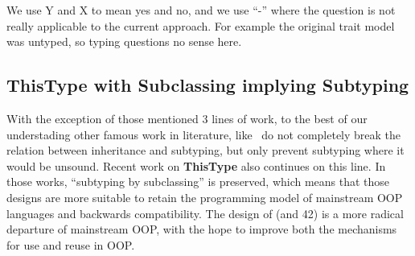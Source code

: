We use Y and X to mean yes and no, and we use ``-'' where the question is not really applicable to the current approach. For example the original trait model was untyped, so typing questions no sense here.

\subsection{ThisType with Subclassing implying Subtyping}
With the exception of those mentioned 3 lines of work, to the best of our understading
other famous work in literature, like~\cite{odersky2008programming,nystrom2006j}
do not completely break the relation between inheritance and subtyping, but only prevent subtyping where 
it would be unsound.
Recent work on {\bf ThisType} \cite{Saito:2009,ryu16ThisType}
also continues on this line.
In those works, ``subtyping by subclassing'' is preserved, which means
that those designs are more suitable to retain the programming model
of mainstream OOP languages and backwards compatibility. The design 
of \name (and 42) is a more radical departure of mainstream OOP, with
the hope to improve both the mechanisms for use and reuse in OOP.


